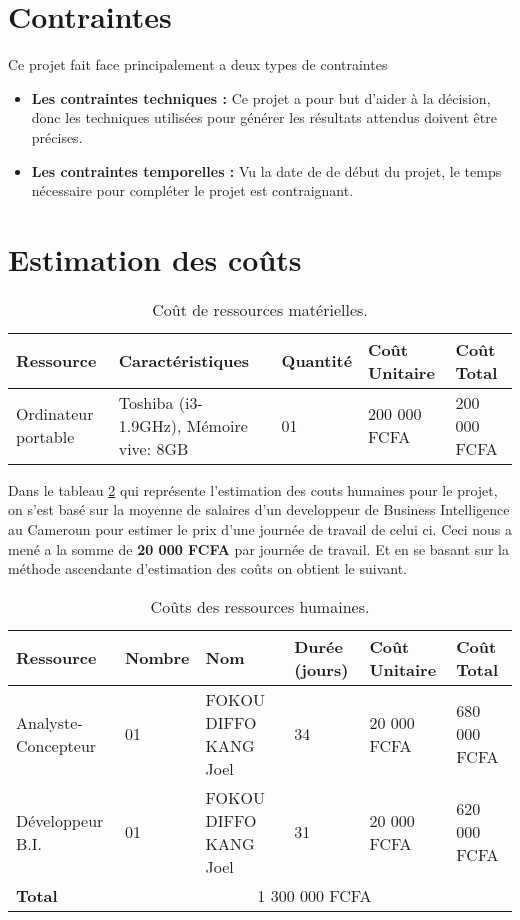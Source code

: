 \section{Contraintes}
Ce projet fait face principalement a deux types de contraintes\begin{itemize}
    \item \textbf{Les contraintes techniques :} Ce projet a pour but d'aider à la décision, donc les techniques utilisées pour générer les résultats attendus doivent être précises.
    \item \textbf{Les contraintes temporelles :} Vu la date de de début du projet, le temps nécessaire pour compléter le projet est contraignant.
\end{itemize}


\section{Estimation des coûts}

\begin{table}[H]
    \centering
    \caption{Coût de ressources matérielles.}
    \begin{tabular}[t]{|p{3cm}|p{4cm}|p{2cm}|p{3cm}|p{3cm}|}
        \hline
        \textbf{Ressource} & \textbf{Caractéristiques} & \textbf{Quantité} & \textbf{Coût Unitaire} & \textbf{Coût Total}\\
        \hline\hline
        Ordinateur portable & Toshiba (i3-1.9GHz), Mémoire vive: 8GB & 01 & 200 000 FCFA & 200 000 FCFA\\
        \hline\hline
    \end{tabular}
    \label{tab:resmat}
\end{table}%

Dans le tableau \ref{tab:reshum} qui représente l'estimation des couts humaines pour le projet, on s'est basé sur la moyenne de salaires d'un developpeur de Business Intelligence au Cameroun pour estimer le prix d'une journée de travail de celui ci. Ceci nous a mené a la somme de \textbf{20 000 FCFA} par journée de travail. Et en se basant sur la méthode ascendante d'estimation des coûts on obtient le suivant.

\begin{table}[H]
    \centering
    \caption{Coûts des ressources humaines.}
    \begin{tabular}[t]{|p{2cm}|p{1.5cm}|p{3cm}|p{1.5cm}|p{3cm}|p{3cm}|} 
        \hline
        \textbf{Ressource} & \textbf{Nombre} & \textbf{Nom} & \textbf{Durée (jours)} & \textbf{Coût Unitaire} & \textbf{Coût Total}\\
        \hline\hline
        Analyste-Concepteur & 01 & FOKOU DIFFO KANG Joel & 34 & 20 000 FCFA & 680 000 FCFA\\
        \hline
        Développeur B.I. & 01 & FOKOU DIFFO KANG Joel & 31 & 20 000 FCFA & 620 000 FCFA\\
        \hline
        \textbf{Total} & \multicolumn{5}{c}{1 300 000 FCFA} \\
        \hline\hline
    \end{tabular}
    \label{tab:reshum}
\end{table}%


